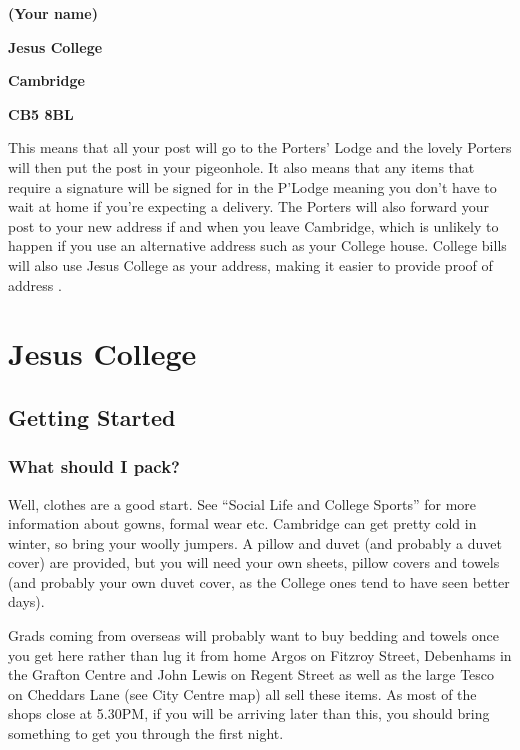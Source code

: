 \documentclass[11pt,fleqn, oneside]{book} %
\begin{document}
\textbf{(Your name)}

\textbf{Jesus College}

\textbf{Cambridge}

\textbf{CB5 8BL}

This means that all your post will go to the Porters’ Lodge and the lovely Porters will then put the post in your pigeonhole.  It also means that any items that require a signature will be signed for in the P’Lodge meaning you don’t have to wait at home if you’re expecting a delivery.  The Porters will also forward your post to your new address if and when you leave Cambridge, which is unlikely to happen if you use an alternative address such as your College house.  College bills will also use Jesus College as your address, making it easier to provide proof of address .





\chapter{Jesus College}

\section{Getting Started}

\subsection{What should I pack?}

Well, clothes are a good start. See “Social Life and College Sports” for more information about gowns, formal wear etc. Cambridge can get pretty cold in winter, so bring your woolly jumpers. A pillow and duvet (and probably a duvet cover) are provided, but you will need your own sheets, pillow covers and towels (and probably your own duvet cover, as the College ones tend to have seen better days). 

Grads coming from overseas will probably want to buy bedding and towels once you get here rather than lug it from home Argos on Fitzroy Street, Debenhams in the Grafton Centre and John Lewis on Regent Street as well as the large Tesco on Cheddars Lane (see City Centre map) all sell these items. As most of the shops close at 5.30PM, if you will be arriving later than this, you should bring something to get you through the first night.
\end{document}
